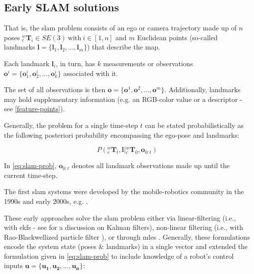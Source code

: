 \documentclass[headsepline, hidelinks, footsepline, footinclude=false, oneside, fontsize=11pt, paper=a4, listof=totoc, bibliography=totoc]{scrbook}
\begin{document}
\subsection{Early SLAM solutions}
\label{sec:org07866cc}
That is, the \gls{slam} problem consists of an ego or camera trajectory made up of \(n\) poses \({}^w_c\mathbf{T}_i \in SE(3) ~\text{with}~ i \in [1, n]\) and \(m\) Euclidean points 
(so-called landmarks \(\mathbf{l} = \{\mathbf{l}_1, \mathbf{l}_{2}, ..., \mathbf{l}_m\}\)) that describe the map. 

Each landmark \(\mathbf{l}_i\), in turn, has \(k\) measurements or observations \(\mathbf{o}^i = \{\mathbf{o}^i_1, \mathbf{o}^i_2, ..., \mathbf{o}^i_k\}\) associated with it. 

The set of all observations is then \(\mathbf{o} = \{\mathbf{o}^1, \mathbf{o}^2, ..., \mathbf{o}^m\}\).
Additionally, landmarks may hold supplementary information (e.g. an RGB-color value or a descriptor - see \cref{feature-points}).

Generally, the problem for a single time-step \(t\) can be stated probabilistically as the following posteriori probability encompassing the ego-pose and landmarks:

\begin{equation}
\label{eq:slam-prob}
P({}^w_c\mathbf{T}_t, \mathbf{l} | {}^w_c\mathbf{T}_0, \mathbf{o}_{0:t})
\end{equation}

In \cref{eq:slam-prob}, \(\mathbf{o}_{0:t}\) denotes all landmark observations made up until the current time-step. 

The first \gls{slam} systems were developed by the mobile-robotics community in the 1990s and early 2000s, e.g. \cite{leonardSimultaneousMapBuilding1991,guivantLocalizationMapBuilding2000,gutmannIncrementalMappingLarge1999,10.5555/777092.777184}.

These early approaches solve the \gls{slam} problem either via linear-filtering \cite{leonardSimultaneousMapBuilding1991} (i.e., with \glspl{ekf} - see \cite{brownIntroductionRandomSignals1997} for a discussion on Kalman filters), 
non-linear filtering (i.e., with Rao-Blackwellized particle filter \cite{10.5555/777092.777184}), or through \glspl{mle} \cite{cadenaPresentFutureSimultaneous2016}. 
Generally, these formulations encode the system state (poses \& landmarks) in a single vector and extended the formulation given in \cref{eq:slam-prob} to include knowledge of a robot's control inputs 
\(\mathbf{{u} = \{\mathbf{u}_1, \mathbf{u}_2, ..., \mathbf{u}_n\}}\):
\end{document}
